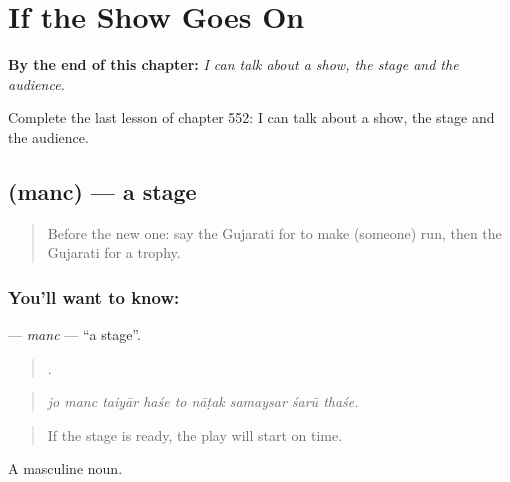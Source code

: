 
\chapter{If the Show Goes On}
\label{ch:gu-if-the-show-goes-on}

\begin{chapteropening}
\textbf{By the end of this chapter:} \emph{I can talk about a show, the stage and the audience.}

Complete the last lesson of chapter 552: I can talk about a show, the stage and the audience.
\end{chapteropening}

\section[\texorpdfstring{\gu{મંચ} (manc)}{મંચ (manc)}]{ (manc) — a stage}

\label{lesson:GU-C552-manc}



\begin{quote}
Before the new one: say the Gujarati for to make (someone) run, then the Gujarati for a trophy.
\end{quote}

\subsection*{You'll want to know: }
\textbf{} — \emph{manc} — \textquotedblleft{}a stage\textquotedblright{}.

\begin{quote}
        .
\end{quote}

\begin{quote}
\emph{jo manc taiyār haśe to nāṭak samaysar śarū thaśe.}
\end{quote}

\begin{quote}
If the stage is ready, the play will start on time.
\end{quote}

A masculine noun.

